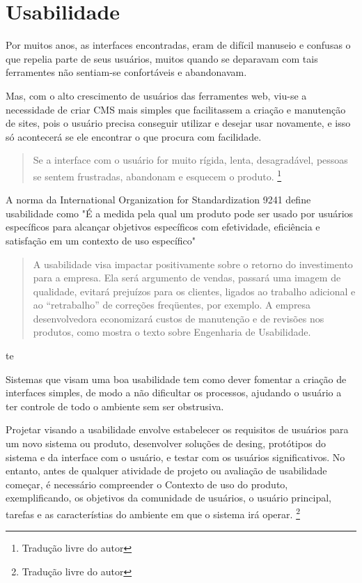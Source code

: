\chapter{Usabilidade}

Por muitos anos, as interfaces encontradas, eram de difícil manuseio e confusas o que repelia parte de seus usuários, muitos quando se deparavam com tais ferramentes não sentiam-se confortáveis e abandonavam.

Mas, com o alto crescimento de usuários das ferramentes web, viu-se a necessidade de criar CMS mais simples que facilitassem a criação e manutenção de sites, pois o usuário precisa conseguir utilizar e desejar usar novamente, e isso só acontecerá se ele encontrar o que procura com facilidade.

\begin{quote} 
Se a interface com o usuário for muito rígida, lenta, desagradável, pessoas se sentem frustradas, abandonam e esquecem o produto.
\cite{usability_evaluation_learning}\footnote{Tradução livre do autor}
\end{quote}

A norma da International Organization for Standardization 9241 define usabilidade como "É a medida pela qual um produto pode ser usado por usuários específicos para alcançar objetivos específicos com efetividade, eficiência e satisfação em um contexto de uso específico"

\begin {quote}
A usabilidade visa impactar positivamente sobre o retorno do investimento para a empresa. Ela será argumento de vendas, passará uma imagem de qualidade, evitará prejuízos para os clientes, ligados ao trabalho adicional e ao “retrabalho” de correções freqüentes, por exemplo. A empresa desenvolvedora economizará custos de manutenção e de revisões nos produtos, como mostra o texto sobre Engenharia de Usabilidade.
\cite{nielsen_usabilidade}
\end{quote}te

Sistemas que visam uma boa usabilidade tem como dever fomentar a criação de interfaces simples, de modo a não dificultar os processos, ajudando o usuário a ter controle de todo o ambiente sem ser obstrusiva.

Projetar visando a usabilidade envolve estabelecer os requisitos de usuários para um novo sistema ou produto, desenvolver soluções de desing, protótipos do sistema e da interface com o usuário, e testar com os usuários significativos. No entanto, antes de qualquer atividade de projeto ou avaliação de usabilidade começar, é necessário compreender o Contexto de uso do produto, exemplificando, os objetivos da comunidade de usuários, o usuário principal, tarefas e as característias do ambiente em que o sistema irá operar.
\cite{maguire_context_of_use}\footnote{Tradução livre do autor}

